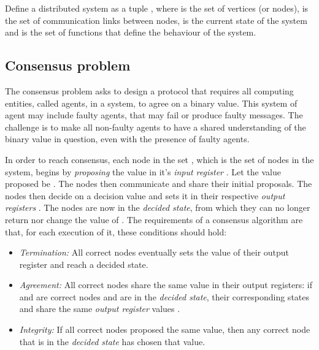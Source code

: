 Define a distributed system as a tuple , where  is the set of vertices (or nodes),  is the set of communication links between nodes,  is the current state of the system and  is the set of functions that define the behaviour of the system.

\subsection{Consensus problem}

The consensus problem asks to design a protocol that requires all computing entities, called agents, in a system, to agree on a binary value. This system of agent may include faulty agents, that may fail or produce faulty messages. The challenge is to make all non-faulty agents to have a shared understanding of the binary value in question, even with the presence of faulty agents. 

In order to reach consensus, each node in the set , which is the set of nodes in the system, begins by \emph{proposing} the value in it's \emph{input register} . Let the value proposed be . The nodes then communicate and share their initial proposals. The nodes then decide on a decision value  and sets it in their respective \emph{output registers} . The nodes are now in the \emph{decided state}, from which they can no longer return nor change the value of . The requirements of a consensus algorithm are that, for each execution of it, these conditions should hold:

\begin{itemize}[label={}]
  \item \emph{Termination:} All correct nodes eventually sets the value of their output register and reach a decided state.
  \item \emph{Agreement:} All correct nodes share the same value in their output registers: if  and  are correct nodes and are in the \emph{decided state}, their corresponding states  and  share the same \emph{output register} values .
  \item \emph{Integrity:} If all correct nodes proposed the same value, then any correct node that is in the \emph{decided state} has chosen that value.
\end{itemize}

